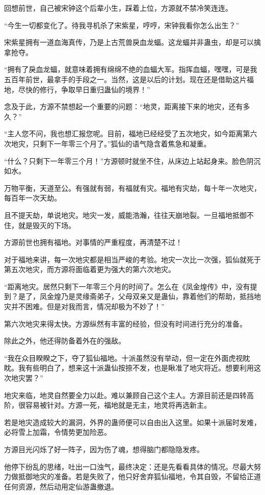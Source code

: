 \begin{this_body}
回想前世，自己被宋钟这个后辈小生，踩着上位，方源就不禁冷笑连连。

“今生一切都变化了。待我寻机杀了宋紫星，哼哼，宋钟我看你怎么出生？”

宋紫星拥有一道血海真传，乃是上古荒兽戾血龙蝠。这龙蝠并非蛊虫，却是可以擒拿抢夺。

“拥有了戾血龙蝠，就意味着拥有绵绵不绝的血蝠大军。指挥血蝠，嘿嘿，可是我五百年前世，最拿手的手段之一。当然，这是以后的计划。现在还是借助这片福地，尽快的修行，争取早日重归蛊仙的境界！”

念及于此，方源不禁想起一个重要的问题：“地灵，距离接下来的地灾，还有多久？”

“主人您不问，我也想汇报您呢。目前，福地已经经受了五次地灾，如今距离第六次地灾，只剩下一年零三个月了。”狐仙的语气隐含着焦急和凝重。

“什么？只剩下一年零三个月！”方源顿时就坐不住，从床边上站起身来。脸色阴沉如水。

万物平衡，天道至公。有强就有弱，有福就有灾。福地有灾劫，每十年一次地灾，每百年一次天劫。

且不提天劫，单说地灾。地灾一发，威能浩瀚，往往天崩地裂。一旦福地抵御不住，就是毁灭的下场。

方源前世也拥有福地。对事情的严重程度，再清楚不过！

对于福地来讲，每一次地灾都是相当严峻的考验。地灾一次比一次强，狐仙就死于第五次地灾，而方源将面临着更为强大的第六次地灾。

“距离地灾。居然只剩下一年零三个月的时间了。怎么在《凤金煌传》中，没有提到？是了，凤金煌乃是灵缘斋弟子，父母双亲又是蛊仙，靠着他们的帮助，抵挡地灾并不困难。但是对我而言，情况却极为不妙了！”

第六次地灾来得太快。方源纵然有丰富的经验，但没有时间进行充分的准备。

除此之外，他还得防备着外在的强敌。

“我在众目睽睽之下，夺了狐仙福地。十派虽然没有举动，但一定在外面虎视眈眈。我有些明白了，想来这十派蛊仙按捺不发，也是瞅准了地灾将近。想要利用这次地灾罢？”

地灾来临，地灵自然要全力以赴。难以兼顾自己这个主人。方源目前还是四转高阶，很容易被针对。方源一死，福地就是无主，地灵将再选新主。

若是地灾造成较大的漏洞，外界的蛊师便可以自由出入这里。如果十派届时发难，必将雪上加霜，令情势更加险恶。

方源目光闪烁了好一阵子，因为伤了魂，想得脑门都隐隐发疼。

他停下纷乱的思绪，吐出一口浊气，最终决定：还是先看看具体的情况。尽最大努力做抵御地灾的准备。若是失败了，他只好舍弃狐仙福地，令其自毁，不留给正道任何资源，然后动用定仙游蛊撤退。


\end{this_body}
